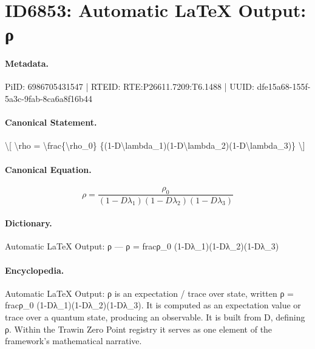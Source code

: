 \section*{ID6853: Automatic LaTeX Output: ρ}
\paragraph{Metadata.}
PiID: 6986705431547 | RTEID: RTE:P26611.7209:T6.1488 | UUID: dfe15a68-155f-5a3c-9fab-8ca6a8f16b44

\paragraph{Canonical Statement.}
\textbackslash{}[ \textbackslash{}rho = \textbackslash{}frac\{\textbackslash{}rho\_0\} \{(1-D\textbackslash{}lambda\_1)(1-D\textbackslash{}lambda\_2)(1-D\textbackslash{}lambda\_3)\} \textbackslash{}]

\paragraph{Canonical Equation.}
\[
\rho = \frac{\rho_0} {(1-D\lambda_1)(1-D\lambda_2)(1-D\lambda_3)}
\]

\paragraph{Dictionary.}
Automatic LaTeX Output: ρ — ρ = fracρ\_0 (1-Dλ\_1)(1-Dλ\_2)(1-Dλ\_3)

\paragraph{Encyclopedia.}
Automatic LaTeX Output: ρ is an expectation / trace over state, written ρ = fracρ\_0 (1-Dλ\_1)(1-Dλ\_2)(1-Dλ\_3). It is computed as an expectation value or trace over a quantum state, producing an observable. It is built from D, defining ρ. Within the Trawin Zero Point registry it serves as one element of the framework's mathematical narrative.
